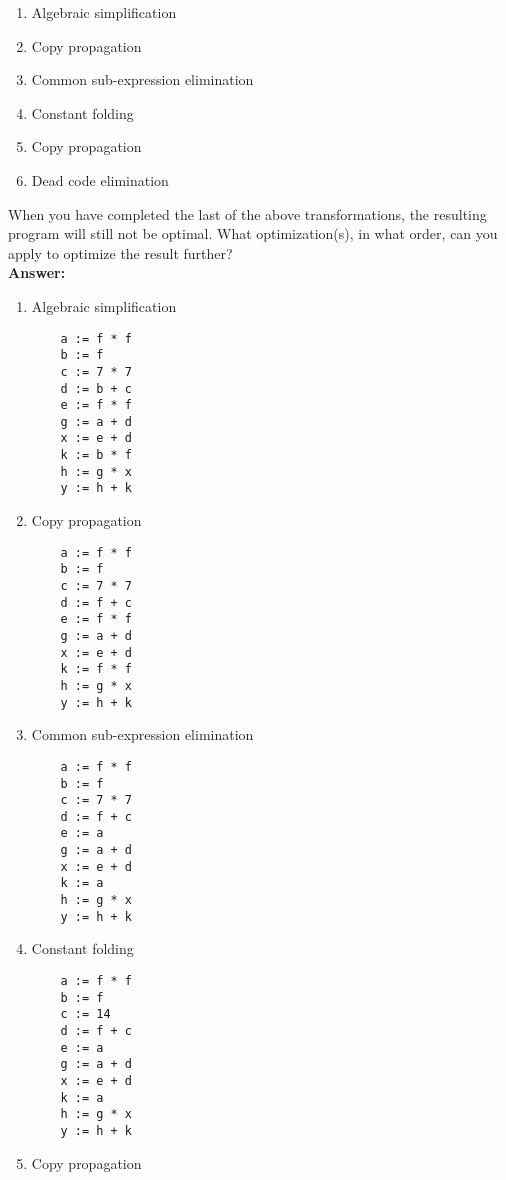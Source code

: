 \documentclass[11pt]{article}
\begin{document}
\begin{enumerate}
  \begin{enumerate}
    \item Algebraic simplification
	
    \item Copy propagation
    \item Common sub-expression elimination
    \item Constant folding
    \item Copy propagation
    \item Dead code elimination
  \end{enumerate}

  
  When you have completed the last of the above transformations, the resulting program will still not be optimal. What optimization(s), in what order, can you apply to optimize the result further?\\
    \textbf{Answer:} 
 
    \begin{enumerate}
    \item Algebraic simplification
	  \begin{lstlisting}
    a := f * f
    b := f
    c := 7 * 7
    d := b + c
    e := f * f
    g := a + d
    x := e + d
    k := b * f
    h := g * x
    y := h + k
  \end{lstlisting}
  
    \item Copy propagation
	\begin{lstlisting}
    a := f * f
    b := f
    c := 7 * 7
    d := f + c
    e := f * f
    g := a + d
    x := e + d
    k := f * f
    h := g * x
    y := h + k
  \end{lstlisting}
  
    \item Common sub-expression elimination
	\begin{lstlisting}
    a := f * f
    b := f
    c := 7 * 7
    d := f + c
    e := a
    g := a + d
    x := e + d
    k := a
    h := g * x
    y := h + k
  \end{lstlisting}
  
  
    \item Constant folding
	\begin{lstlisting}
    a := f * f
    b := f
    c := 14
    d := f + c
    e := a
    g := a + d
    x := e + d
    k := a
    h := g * x
    y := h + k
  \end{lstlisting}
	
  
    \item Copy propagation
	

\end{enumerate}
\end{enumerate}
\end{document}

